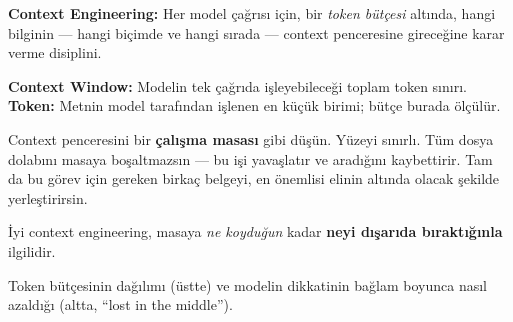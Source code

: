 \begin{problembox}
\textbf{Context Engineering:} Her model çağrısı için, bir \emph{token bütçesi}
altında, hangi bilginin --- hangi biçimde ve hangi sırada --- context penceresine
gireceğine karar verme disiplini.

\smallskip
\textbf{Context Window:} Modelin tek çağrıda işleyebileceği toplam token sınırı.
\textbf{Token:} Metnin model tarafından işlenen en küçük birimi; bütçe burada ölçülür.
\end{problembox}

\begin{mentalbox}
Context penceresini bir \textbf{çalışma masası} gibi düşün. Yüzeyi sınırlı.
Tüm dosya dolabını masaya boşaltmazsın --- bu işi yavaşlatır ve aradığını
kaybettirir. Tam da bu görev için gereken birkaç belgeyi, en önemlisi elinin
altında olacak şekilde yerleştirirsin.

\smallskip
İyi context engineering, masaya \emph{ne koyduğun} kadar \textbf{neyi dışarıda
bıraktığınla} ilgilidir.
\end{mentalbox}

Token bütçesinin dağılımı (üstte) ve modelin dikkatinin bağlam boyunca nasıl
azaldığı (altta, ``lost in the middle'').

